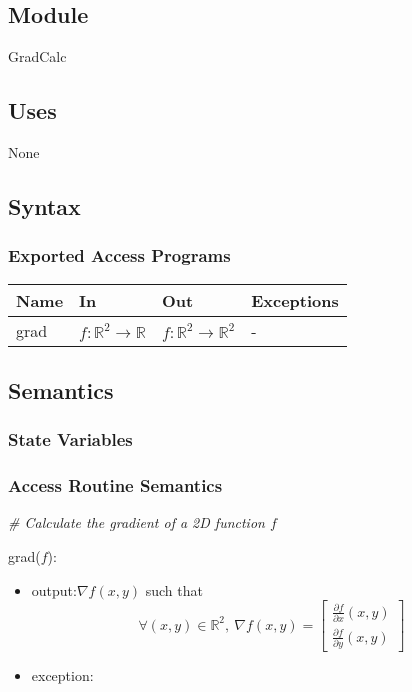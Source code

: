 \documentclass[12pt, titlepage]{article}
\begin{document}
\subsection{Module}
GradCalc
\subsection{Uses}
None
\subsection{Syntax}

\subsubsection{Exported Access Programs}
\begin{center}
\begin{tabular}{p{2cm} p{4cm} p{4cm} p{2cm}}
\hline
\textbf{Name} & \textbf{In} & \textbf{Out} & \textbf{Exceptions} \\
\hline
grad & $f:\mathbb{R}^2\rightarrow\mathbb{R}$  & $f:\mathbb{R}^2\rightarrow\mathbb{R}^2$ & -\\
\hline
\end{tabular}
\end{center}

\subsection{Semantics}

\subsubsection{State Variables}


\subsubsection{Access Routine Semantics}

\noindent\textit{{\#} Calculate the gradient of a 2D function $f$} \medskip

\noindent grad($f$):
\begin{itemize} 
\item output:$ \nabla f(x,y)$ such that
\begin{equation*}
\forall (x,y) \in \mathbb{R}^2, \ \nabla f(x,y) = \begin{bmatrix}
\frac{\partial f}{\partial x}(x,y) \\
\frac{\partial f}{\partial y}(x,y)
\end{bmatrix}
\end{equation*}
\item exception: 
\end{itemize}
\end{document}
